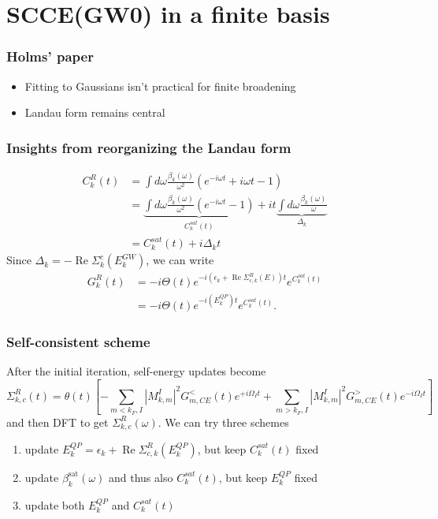 \section{SCCE(GW0) in a finite basis}
\begin{frame}
    \frametitle{Holms' paper}
    \begin{itemize}
        \item Fitting to Gaussians isn't practical for finite broadening \pause
        \item Landau form remains central
    \end{itemize}
\end{frame}
\begin{frame}
    \frametitle{Insights from reorganizing the Landau form}
\begin{align}
    C_{k}^R(t) &= \int d\omega \frac{\beta_{k}(\omega)}{\omega^2} \left( e^{-i\omega t} + i\omega t - 1 \right) \\
&= \underbrace{\int d\omega \frac{\beta_{k}(\omega)}{\omega^2} \left( e^{-i\omega t} - 1 \right)}_{C_k^{sat}(t)} + i t \underbrace{\int d\omega \frac{\beta_{k}(\omega)}{\omega}}_{\Delta_k} \\
&= C_k^{sat}(t) + i \Delta_k t
\end{align}
\pause
Since $\Delta_k=-\operatorname{Re}\Sigma^c_k(E_k^{GW})$, we can write
\begin{align}
    G^{R}_{k}(t)
    &= -i \Theta(t) e^{-i(\epsilon_k + \operatorname{Re} \Sigma_{c, k}^R(E)) t} e^{C_k^{sat}(t)} \\
    &= -i \Theta(t) e^{-i(E_k^{QP}) t} e^{C_k^{sat}(t)}.
\end{align}

\end{frame}
\begin{frame}
    \frametitle{Self-consistent scheme}
After the initial iteration, self-energy updates become 
\begin{equation}
    \Sigma_{k, c}^R(t)=\theta(t)\left[-\sum_{m<k_F, I}\left|M_{ k, m}^I\right|^2 G_{m,CE}^{<}(t) e^{+i \Omega_I t} + \sum_{m>k_F, I}\left|M_{ k, m}^I\right|^2 G_{m,CE}^{>}(t) e^{-i \Omega_I t}\right]
\end{equation}
and then DFT to get $\Sigma_{k, c}^R(\omega)$. \pause We can try three schemes
\begin{enumerate}
    \item update $E_k^{QP} = \epsilon_k + \operatorname{Re} \Sigma_{c, k}^R(E_k^{QP})$, but keep $C_k^{sat}(t)$ fixed \pause
    \item update $\beta_k^{\text{sat}}(\omega)$ and thus also $C_k^{sat}(t)$, but keep $E_k^{QP}$ fixed \pause
    \item update both $E_k^{QP}$ and $C_k^{sat}(t)$ 
\end{enumerate}
\end{frame}
